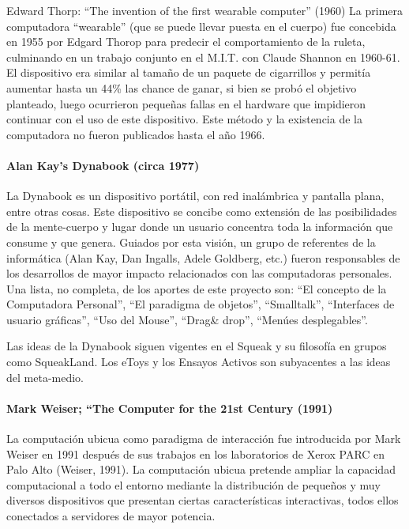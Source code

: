 Edward Thorp: “The invention of the first wearable computer” (1960) La primera computadora “wearable” (que se puede llevar puesta en el cuerpo) fue concebida en 1955 por Edgard Thorop para predecir el comportamiento de la ruleta, culminando en un trabajo conjunto en el M.I.T. con Claude Shannon en 1960-61. El dispositivo era similar al tamaño de un paquete de cigarrillos y permitía aumentar hasta un 44\% las chance de ganar, si bien se probó el objetivo planteado, luego ocurrieron pequeñas fallas en el hardware que impidieron continuar con el uso de este dispositivo. Este método y la existencia de la computadora no fueron publicados hasta el año
1966.


\paragraph {Alan Kay's Dynabook (circa 1977)} 

La Dynabook es un dispositivo portátil, con red inalámbrica y pantalla plana, entre otras cosas. Este dispositivo se concibe como extensión de las posibilidades de la mente-cuerpo y lugar donde un usuario concentra toda la información que consume y que genera. Guiados por esta visión, un grupo de referentes de la informática (Alan Kay, Dan Ingalls, Adele Goldberg, etc.) fueron responsables de los desarrollos de mayor impacto relacionados con las computadoras personales. Una lista, no completa, de los aportes de este proyecto son: “El concepto de la Computadora Personal”, “El paradigma de objetos”, “Smalltalk”, “Interfaces de usuario gráficas”, “Uso del Mouse”, “Drag& drop”, “Menúes desplegables”.

Las ideas de la Dynabook siguen vigentes en el Squeak y su filosofía en grupos como SqueakLand. Los eToys y los Ensayos Activos son subyacentes a las ideas del meta-medio.


\paragraph {Mark Weiser; “The Computer for the 21st Century (1991)}  

La computación ubicua como paradigma de interacción fue introducida por Mark Weiser en 1991 después de sus trabajos en los laboratorios de Xerox PARC en Palo Alto (Weiser, 1991). La computación ubicua pretende ampliar la capacidad computacional a todo el entorno mediante la distribución de pequeños y muy diversos
dispositivos que presentan ciertas características interactivas, todos ellos conectados a
servidores de mayor potencia.

